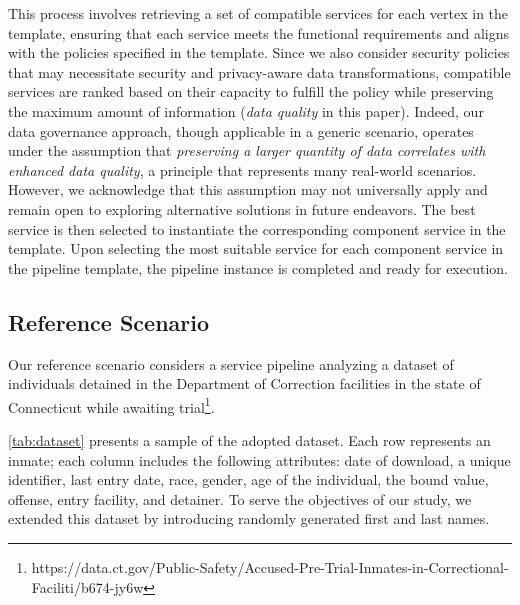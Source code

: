 This process involves retrieving a set of compatible services for each vertex in the template, ensuring that each service meets the functional requirements and aligns with the policies specified in the template. Since we also consider security policies that may necessitate security and privacy-aware data transformations, compatible services are ranked based on their capacity to fulfill the policy while preserving the maximum amount of information (\emph{data quality} in this paper). Indeed, our data governance approach, though applicable in a generic scenario, operates under the assumption that \textit{preserving a larger quantity of data correlates with enhanced data quality}, a principle that represents many real-world scenarios. However, we acknowledge that this assumption may not universally apply and remain open to exploring alternative solutions in future endeavors.
%
The best service is then selected to instantiate the corresponding component service in the template.
Upon selecting the most suitable service for each component service in the pipeline template, the pipeline instance is completed and ready for execution.


\subsection{Reference Scenario}\label{sec:service_definition}

Our reference scenario considers a service pipeline analyzing a dataset of individuals detained in the Department of Correction facilities in the state of Connecticut while awaiting trial\footnote{https://data.ct.gov/Public-Safety/Accused-Pre-Trial-Inmates-in-Correctional-Faciliti/b674-jy6w}.

\cref{tab:dataset} presents a sample of the adopted dataset. Each row represents an inmate; each column includes the following attributes: date of download, a unique identifier, last entry date, race, gender, age of the individual, the bound value, offense, entry facility, and detainer. To serve the objectives of our study, we extended this dataset by introducing randomly generated first and last names.

